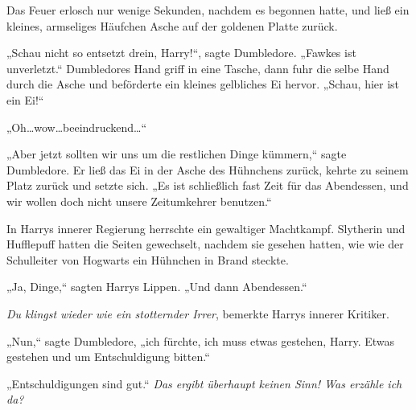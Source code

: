 Das Feuer erlosch nur wenige Sekunden, nachdem es begonnen hatte, und ließ ein kleines, armseliges Häufchen Asche auf der goldenen Platte zurück.

„Schau nicht so entsetzt drein, Harry!“, sagte Dumbledore. „Fawkes ist unverletzt.“ Dumbledores Hand griff in eine Tasche, dann fuhr die selbe Hand durch die Asche und beförderte ein kleines gelbliches Ei hervor. „Schau, hier ist ein Ei!“

„Oh…wow…beeindruckend…“

„Aber jetzt sollten wir uns um die restlichen Dinge kümmern,“ sagte Dumbledore. Er ließ das Ei in der Asche des Hühnchens zurück, kehrte zu seinem Platz zurück und setzte sich. „Es ist schließlich fast Zeit für das Abendessen, und wir wollen doch nicht unsere Zeitumkehrer benutzen.“

In Harrys innerer Regierung herrschte ein gewaltiger Machtkampf. Slytherin und Hufflepuff hatten die Seiten gewechselt, nachdem sie gesehen hatten, wie wie der Schulleiter von Hogwarts ein Hühnchen in Brand steckte.

„Ja, Dinge,“ sagten Harrys Lippen. „Und dann Abendessen.“

\emph{Du klingst wieder wie ein stotternder Irrer}, bemerkte Harrys innerer Kritiker.

„Nun,“ sagte Dumbledore, „ich fürchte, ich muss etwas gestehen, Harry. Etwas gestehen und um Entschuldigung bitten.“

„Entschuldigungen sind gut.“ \emph{Das ergibt überhaupt keinen Sinn! Was erzähle ich da?}

